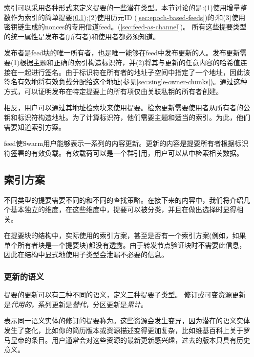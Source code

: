索引可以采用各种形式来定义提要的一些潜在类型。本节讨论的是:(1)使用增量整数作为索引的简单提要(\ref{sec:indexing-schemes});(2)使用历元ID (\ref{sec:epoch-based-feeds})的;和(3)使用密钥链生成的nonces的专用信道feed。(\ref{sec:feed-as-channel})。
所有这些提要类型的统一属性是发布者(所有者)和使用者都必须知道。

发布者是feed块的唯一所有者，也是唯一能够在feed中发布更新的人。发布更新需要(1)根据主题和正确的索引构造标识符，并(2)将其与更新的任意内容的哈希值连接在一起进行签名。由于标识符在所有者的地址子空间中指定了一个地址，因此该签名有效地将有效负载分配给这个地址(参见\ref{sec:single-owner-chunks})。通过这种方式，可以证明发布在特定提要上的所有项仅由关联私钥的所有者创建。

相反，用户可以通过其地址检索块来使用提要。检索更新需要使用者从所有者的公钥和标识符构造地址。为了计算标识符，他们需要主题和适当的索引。为此，他们需要知道索引方案。

feed使Swarm用户能够表示一系列的内容更新。更新的内容是提要所有者根据标识符签署的有效负载。有效载荷可以是一个群引用，用户可以从中检索相关数据。

\subsection{索引方案\statusyellow}\label{sec:indexing-schemes}

不同类型的提要需要不同的和不同的查找策略。在接下来的内容中，我们将介绍几个基本独立的维度，在这些维度中，提要可以被分类，并且在做出选择时显得相关。


在提要块的结构中，实际使用的索引方案，甚至是否有一个索引方案(例如，如果单个所有者块是一个提要块)都没有透露。由于转发节点验证块时不需要此信息，因此在结构中显式地使用子类型会泄漏不必要的信息。 

\subsubsection{更新的语义}

提要的更新可以有三种不同的语义，定义三种提要子类型。
修订或可变资源更新是\emph{代用的}，系列更新是\emph{替代}，分区更新是\emph{累计}。

表示同一语义实体的修订的提要称为。这些资源会发生变异，因为潜在的语义实体发生了变化，比如你的简历版本或资源描述变得更加复杂，比如维基百科上关于罗马皇帝的条目。用户通常会对这些资源的最新更新感兴趣，过去的版本只具有历史意义。

